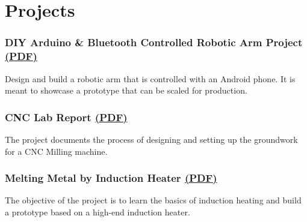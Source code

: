 \section*{Projects}
%
%
%
\subsubsection*{\large
  {\blackColor DIY Arduino \& Bluetooth Controlled Robotic Arm Project}
  \small
  \href{https://drive.google.com/file/d/1gmzZdRsunAH3hOsSkZU2sLoMINN6RA6X/view}{(PDF)}
}
Design and build a robotic arm that is controlled with an Android phone. It is meant to showcase a prototype that can be scaled for production.
%
%
\subsubsection*{\large
  {\blackColor CNC Lab Report}
  \small
  \href{https://drive.google.com/file/d/1sxRlZ2ThcNY0KjlmiwgLPds5Xsv2L8yJ/view?}{(PDF)}
}
The project documents the process of designing and setting up the groundwork for a CNC Milling machine.
%
%
\subsubsection*{\large
  {\blackColor Melting Metal by Induction Heater}
  \small
  \href{https://drive.google.com/file/d/1ay_cD3jObiWNZwhEC6sC6dirg7XZCQKf/view}{(PDF)}
}
The objective of the project is to learn the basics of induction heating and build a prototype based on a high-end induction heater.